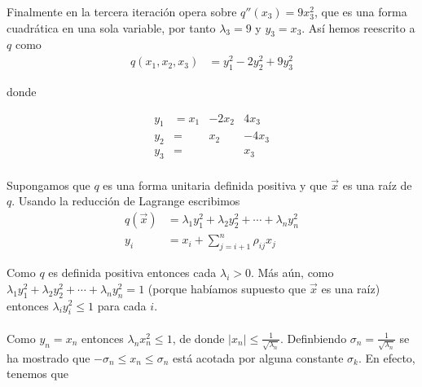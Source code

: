 \begin{example}
Finalmente en la tercera iteración opera sobre $q''\left(x_{3}\right) = 9x_{3}^{2}$, que es una forma cuadrática en una sola variable, por tanto $\lambda_{3} = 9$ y $y_{3} = x_{3}$. Así hemos reescrito a $q$ como 
\begin{equation*}
\begin{split}
q\left(x_{1}, x_{2}, x_{3}\right) & = y_{1}^{2} - 2y_{2}^{2} + 9y_{3}^{2}
\end{split}
\end{equation*}

donde 

\begin{equation*}
\begin{matrix}
y_{1} & =   x_{1}	& - 2x_{2}	&    4x_{3}\\
y_{2} & =		&     x_{2}	&  - 4x_{3}\\
y_{3} & =		&              	&      x_{3}
\end{matrix} 
\end{equation*}

\end{example}

\paragraph{}
Supongamos que $q$ es una forma unitaria definida positiva y que $\overrightarrow{x}$ es una raíz de $q$. Usando la reducción de Lagrange escribimos
\begin{equation*}
\begin{split}
q\left(\overrightarrow{x}\right) & =\lambda_{1}y_{1}^{2} + \lambda_{2}y_{2}^{2} + \cdots + \lambda_{n}y_{n}^{2}\\
y_{i} & = x_{i} + \sum_{j=i+1}^{n}\rho_{ij}x_{j}
\end{split}
\end{equation*}

Como $q$ es definida positiva entonces cada $\lambda_{i} > 0$. Más aún, como $\lambda_{1}y_{1}^{2} + \lambda_{2}y_{2}^{2} + \cdots + \lambda_{n}y_{n}^{2} = 1$ (porque habíamos supuesto que $\overrightarrow{x}$ es una raíz) entonces $\lambda_{i}y_{i}^{2} \leq 1$ para cada $i$.

\paragraph{}
Como $y_{n} = x_{n}$ entonces $\lambda_{n}x_{n}^{2} \leq 1$, de donde $|x_{n}| \leq \frac{1}{\sqrt{\lambda_{n}}}$. Definbiendo $\sigma_{n}=\frac{1}{\sqrt{\lambda_{n}}}$ se ha mostrado que $-\sigma_{n} \leq x_{n} \leq \sigma_{n}$ está acotada por alguna constante $\sigma_{k}$. En efecto, tenemos que 

